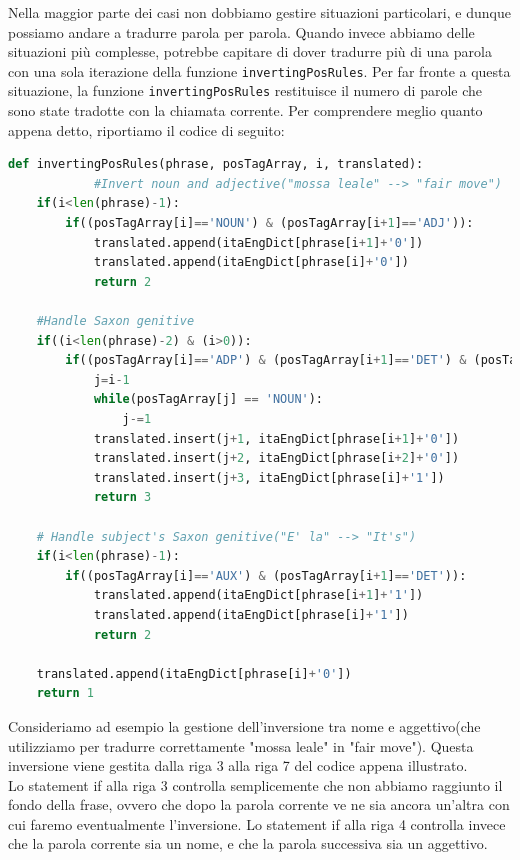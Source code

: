 \documentclass[10pt]{article}
\begin{document}
Nella maggior parte dei casi non dobbiamo gestire situazioni particolari, e dunque possiamo andare a tradurre parola per parola. Quando invece abbiamo delle situazioni più complesse, potrebbe capitare di dover tradurre più di una parola con una sola iterazione della funzione \texttt{invertingPosRules}. Per far fronte a questa situazione, la funzione \texttt{invertingPosRules} restituisce il numero di parole che sono state tradotte con la chiamata corrente. Per comprendere meglio quanto appena detto, riportiamo il codice di seguito:
\begin{lstlisting}[language=Python]
def invertingPosRules(phrase, posTagArray, i, translated):
			#Invert noun and adjective("mossa leale" --> "fair move")
    if(i<len(phrase)-1):
        if((posTagArray[i]=='NOUN') & (posTagArray[i+1]=='ADJ')):
            translated.append(itaEngDict[phrase[i+1]+'0'])
            translated.append(itaEngDict[phrase[i]+'0'])
            return 2
            
    #Handle Saxon genitive
    if((i<len(phrase)-2) & (i>0)):
        if((posTagArray[i]=='ADP') & (posTagArray[i+1]=='DET') & (posTagArray[i+2]=='NOUN')):
            j=i-1
            while(posTagArray[j] == 'NOUN'): 
                j-=1
            translated.insert(j+1, itaEngDict[phrase[i+1]+'0'])
            translated.insert(j+2, itaEngDict[phrase[i+2]+'0'])
            translated.insert(j+3, itaEngDict[phrase[i]+'1'])
            return 3
        
    # Handle subject's Saxon genitive("E' la" --> "It's")  
    if(i<len(phrase)-1):
        if((posTagArray[i]=='AUX') & (posTagArray[i+1]=='DET')):
            translated.append(itaEngDict[phrase[i+1]+'1'])
            translated.append(itaEngDict[phrase[i]+'1'])
            return 2
    
    translated.append(itaEngDict[phrase[i]+'0'])
    return 1
\end{lstlisting}
Consideriamo ad esempio la gestione dell'inversione tra nome e aggettivo(che utilizziamo per tradurre correttamente "mossa leale" in "fair move"). Questa inversione viene gestita dalla riga 3 alla riga 7 del codice appena illustrato.\\
Lo statement if alla riga 3 controlla semplicemente che non abbiamo raggiunto il fondo della frase, ovvero che dopo la parola corrente ve ne sia ancora un'altra con cui faremo eventualmente l'inversione. Lo statement if alla riga 4 controlla invece che la parola corrente sia un nome, e che la parola successiva sia un aggettivo.\\
\end{document}
